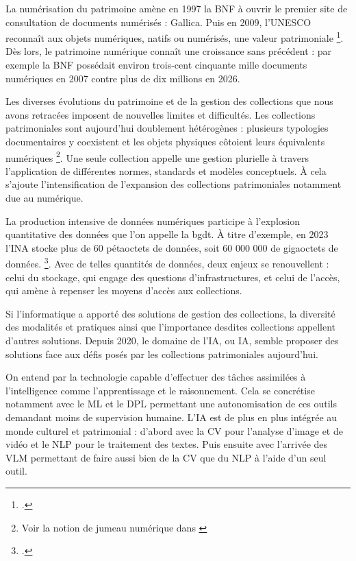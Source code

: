 La numérisation du patrimoine amène en 1997 la \gls{BNF} à ouvrir le premier site de consultation de documents numérisés : Gallica. Puis en 2009, l'UNESCO reconnaît aux objets numériques, natifs ou numérisés, une valeur patrimoniale \footcite{CharteConservationPatrimoine}. Dès lors, le patrimoine numérique connaît une croissance sans précédent : par exemple la \gls{BNF} possédait environ trois-cent cinquante mille documents numériques en 2007 contre plus de dix millions en 2026.\newline
		
Les diverses évolutions du patrimoine et de la gestion des collections que nous avons retracées imposent de nouvelles limites et difficultés. Les collections patrimoniales sont aujourd'hui doublement hétérogènes : plusieurs typologies documentaires y coexistent et les objets physiques côtoient leurs équivalents numériques \footnote{Voir la notion de jumeau numérique dans  \cite{bergeotJumeauNumeriqueDans2025}}. Une seule collection appelle une gestion plurielle à travers l'application de différentes normes, standards et modèles conceptuels. À cela s'ajoute l'intensification de l'expansion des collections patrimoniales notamment due au numérique. 
		
La production intensive de données numériques  participe à l'explosion quantitative des données que l'on appelle la \gls{bgdt}. À titre d'exemple, en 2023 l'INA stocke plus de 60 pétaoctets de données, soit 60 000 000 de gigaoctets de données. \footcite{joannaStockerDonneesPiste2023}. Avec de telles quantités de données, deux enjeux se renouvellent : celui du stockage, qui engage des questions d'infrastructures, et celui de l'accès, qui amène à repenser les moyens d'accès aux collections.
		
Si l'informatique a apporté des solutions de gestion des collections, la diversité des modalités et pratiques ainsi que l'importance desdites collections appellent d'autres solutions. Depuis 2020, le domaine de l'\gls{IA}, ou IA, semble proposer des solutions face aux défis posés par les collections patrimoniales aujourd'hui. 
		
On entend par  la technologie capable d'effectuer des tâches assimilées à l'intelligence comme l'apprentissage et le raisonnement. Cela se concrétise notamment avec le \gls{ML} et le \gls{DPL} permettant une autonomisation de ces outils demandant moins de supervision humaine. L'\gls{IA} est de plus en plus intégrée au monde culturel et patrimonial : d'abord avec la \gls{CV} pour l'analyse d'image et de vidéo et le \gls{NLP} pour le traitement des textes. Puis ensuite avec l'arrivée des \gls{VLM} permettant de faire aussi bien de la \gls{CV} que du \gls{NLP} à l'aide d'un seul outil.
		
